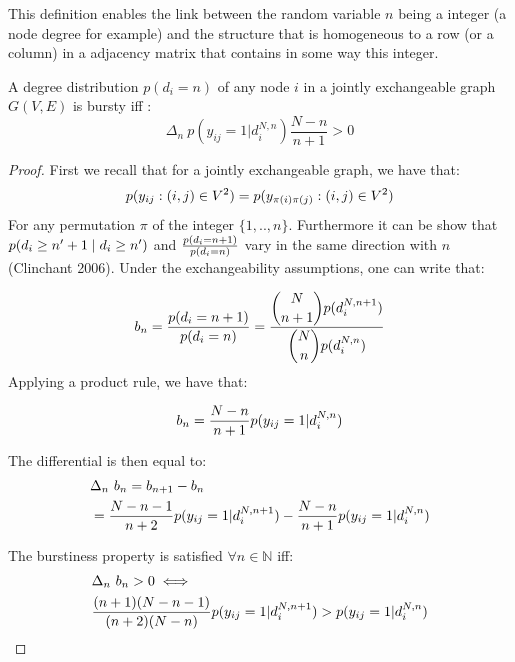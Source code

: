 This definition enables the link between the random variable $n$ being a integer (a node degree for example) and the structure that is homogeneous to a row (or a column) in a adjacency matrix that contains in some way this integer.

\begin{theorem} \label{th:burst_exch}
	 A degree distribution $p(d_i=n)$ of any node $i$ in a jointly exchangeable graph $G(V,E)$ is bursty iff :
	\begin{equation}
	 \Delta_n\   p(y_{ij}=1 | d_i^{N,n}) \frac{N-n}{n+1} > 0
	\end{equation}

\end{theorem}

\begin{proof} 	\label{proof:glob}
	First we recall that for a jointly exchangeable graph, we have that:
	\begin{equation*}
	p(y_{ij}: (i,j) \in V^2) = p(y_{\pi(i)\pi(j)}: (i,j) \in V^2)
	\end{equation*}
	For any permutation $\pi$ of the integer $\{1,..,n\}$. Furthermore it can be show that $ p(d_i \geq n'+1 \mid d_i \geq n')$ and $\frac{p(d_i=n+1)}{p(d_i=n)}$ vary in the same direction with $n$ (Clinchant 2006). Under the exchangeability assumptions, one can write that:
	
	\begin{align*}
	 b_n=\frac{p(d_i=n+1)}{p(d_i=n)} = \frac{\dbinom{N}{n+1} p(d_i^{N,n+1})}{\dbinom{N}{n} p(d_i^{N,n})}
	\end{align*}
 Applying a product rule, we have that:
	
	\begin{equation*}
	b_n = \frac{N-n}{n+1} p(y_{ij}=1 | d_i^{N,n})
	\end{equation*}
	
	The differential is then equal to:
	\begin{align*}
	&\Delta_n\  b_n= b_{n+1} - b_n  \\
	&= \frac{N-n-1}{n+2} p(y_{ij}=1 | d_i^{N,n+1}) - \frac{N-n}{n+1} p(y_{ij}=1 | d_i^{N,n})
	\end{align*}
	
	The burstiness property is satisfied  $\forall n \in \mathbb{N}$ iff:
	\begin{align} \label{b-theorem}
	&\Delta_n\  b_n > 0 \iff \nonumber \\
	& \frac{(n+1)(N-n-1)}{(n+2)(N-n)}\p(y_{ij}=1 | d_i^{N,n+1})  > \p(y_{ij}=1 | d_i^{N,n})
	\end{align}
	
\end{proof}

